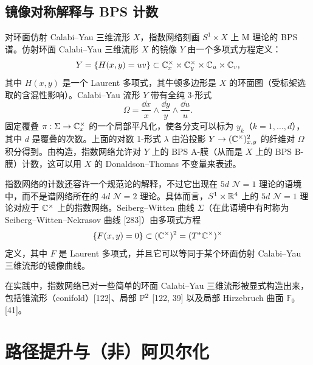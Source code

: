 \subsection*{镜像对称解释与 BPS 计数}

对环面仿射 Calabi–Yau 三维流形 $X$，指数网络刻画 $S^1\times X$ 上 M 理论的 BPS 谱。仿射环面 Calabi–Yau 三维流形 $X$ 的镜像 $Y$ 由一个多项式方程定义：
\[
Y=\{H(x,y)=uv\}\subset\mathbb{C}^\times_x\times\mathbb{C}^\times_y\times\mathbb{C}_u\times\mathbb{C}_v,
\]
其中 $H(x,y)$ 是一个 Laurent 多项式，其牛顿多边形是 $X$ 的环面图（受标架选取的含混性影响）。Calabi–Yau 流形 $Y$ 带有全纯 3-形式
\[
\Omega=\frac{\dd x}{x}\wedge\frac{\dd y}{y}\wedge\frac{\dd u}{u}.
\]
固定覆叠 $\pi:\Sigma\to\mathbb{C}^\times_x$ 的一个局部平凡化，使各分支可以标为 $y_k$（$k=1,\dots,d$），其中 $d$ 是覆叠的次数。上面的对数 1-形式 $\lambda$ 由沿投影 $Y\to(\mathbb{C}^\times)^2_{x,y}$ 的纤维对 $\Omega$ 积分得到。由构造，指数网络允许对 $Y$ 上的 BPS A-膜（从而是 $X$ 上的 BPS B-膜）计数，这可以用 $X$ 的 Donaldson–Thomas 不变量来表述。

指数网络的计数还容许一个规范论的解释，不过它出现在 $5d$ $\mathcal{N}=1$ 理论的语境中，而不是谱网络所在的 $4d$ $\mathcal{N}=2$ 理论。具体而言，$S^1\times\mathbb{R}^4$ 上的 $5d$ $\mathcal{N}=1$ 理论对应于 $\mathbb{C}^\times$ 上的指数网络。Seiberg–Witten 曲线 $\Sigma$（在此语境中有时称为 Seiberg–Witten–Nekrasov 曲线 [283]）由多项式方程
\[
\{F(x,y)=0\}\subset(\mathbb{C}^\times)^2=(T^*\mathbb{C}^\times)^\times
\]
定义，其中 $F$ 是 Laurent 多项式，并且它可以等同于某个环面仿射 Calabi–Yau 三维流形的镜像曲线。

在实践中，指数网络已对一些简单的环面 Calabi–Yau 三维流形被显式构造出来，包括锥流形（conifold）[122]、局部 $\mathbb{P}^2$ [122, 39] 以及局部 Hirzebruch 曲面 $\mathbb{F}_0$ [41]。

\section{路径提升与（非）阿贝尔化}

